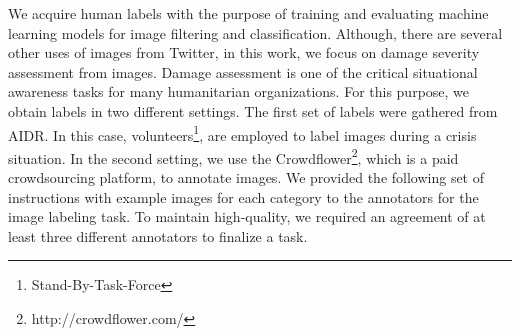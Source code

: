 \documentclass{iscram}
\begin{document}
We acquire human labels with the purpose of training and evaluating machine learning models for image filtering and classification. Although, there are several other uses of images from Twitter, in this work, we focus on damage severity assessment from images. Damage assessment is one of the critical situational awareness tasks for many humanitarian organizations. For this purpose, we obtain labels in two different settings. The first set of labels were gathered from AIDR. In this case, volunteers\footnote{Stand-By-Task-Force}, are employed to label images during a crisis situation. In the second setting, we use the Crowdflower\footnote{http://crowdflower.com/}, which is a paid crowdsourcing platform, to annotate images. We provided the following set of instructions with example images for each category to the annotators for the image labeling task. To maintain high-quality, we required an agreement of at least three different annotators to finalize a task.
\end{document}

